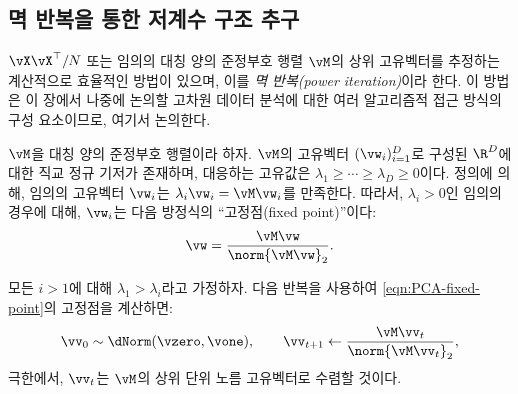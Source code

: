 \documentclass[../../book-main_ko.tex]{subfiles}
\begin{document}
\subsection{멱 반복을 통한 저계수 구조 추구}\label{subsec:power iterations}

\(\vX\vX^{\top}/N\) 또는 임의의 대칭 양의 준정부호 행렬 \(\vM\)의 상위 고유벡터를 추정하는 계산적으로 효율적인 방법이 있으며, 이를 \textit{멱 반복(power iteration)}이라 한다. 이 방법은 이 장에서 나중에 논의할 고차원 데이터 분석에 대한 여러 알고리즘적 접근 방식의 구성 요소이므로, 여기서 논의한다.

\(\vM\)을 대칭 양의 준정부호 행렬이라 하자. \(\vM\)의 고유벡터 \((\vw_{i})_{i = 1}^{D}\)로 구성된 \(\R^{D}\)에 대한 직교 정규 기저가 존재하며, 대응하는 고유값은 \(\lambda_{1} \geq \cdots \geq \lambda_{D} \geq 0\)이다. 정의에 의해, 임의의 고유벡터 $\vw_i$는 $\lambda_i \vw_i = \vM \vw_i$를 만족한다. 따라서, $\lambda_i > 0$인 임의의 경우에 대해, $\vw_i$는 다음 방정식의 ``고정점(fixed point)''이다:
\begin{equation}
    \vw = \frac{\vM\vw}{\norm{\vM\vw}_{2}}.
    \label{eqn:PCA-fixed-point}
\end{equation}

\begin{theorem}[멱 반복]
모든 \(i > 1\)에 대해 \(\lambda_{1} > \lambda_{i}\)라고 가정하자. 다음 반복을 사용하여 \eqref{eqn:PCA-fixed-point}의 고정점을 계산하면:
\begin{equation}\label{eq:power_iteration}
    \vv_{0} \sim \dNorm(\vzero, \vone), \qquad \vv_{t + 1} \gets \frac{\vM\vv_{t}}{\norm{\vM\vv_{t}}_{2}},
\end{equation}
극한에서, \(\vv_{t}\)는 \(\vM\)의 상위 단위 노름 고유벡터로 수렴할 것이다.
\end{theorem}
\end{document}
